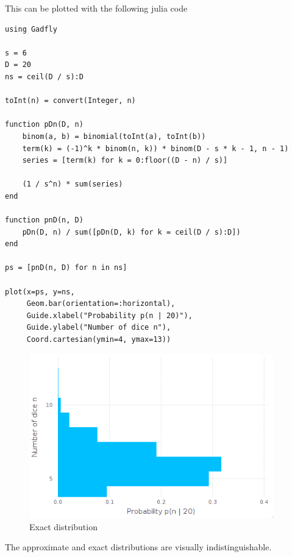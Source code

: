 \documentclass[10pt,a4paper]{article}
\begin{document}
This can be plotted with the following julia code
\begin{verbatim}
using Gadfly

s = 6
D = 20
ns = ceil(D / s):D

toInt(n) = convert(Integer, n)

function pDn(D, n)
    binom(a, b) = binomial(toInt(a), toInt(b))
    term(k) = (-1)^k * binom(n, k)) * binom(D - s * k - 1, n - 1)
    series = [term(k) for k = 0:floor((D - n) / s)]

    (1 / s^n) * sum(series)
end

function pnD(n, D)
    pDn(D, n) / sum([pDn(D, k) for k = ceil(D / s):D])
end

ps = [pnD(n, D) for n in ns]

plot(x=ps, y=ns,
     Geom.bar(orientation=:horizontal),
     Guide.xlabel("Probability p(n | 20)"),
     Guide.ylabel("Number of dice n"),
     Coord.cartesian(ymin=4, ymax=13))
\end{verbatim}
\begin{figure}[h]
  \centering
  \includegraphics[width=300pt]{julia-exact}
  \caption{Exact distribution}
\end{figure}
The approximate and exact distributions are visually indistinguishable.
\end{document}
